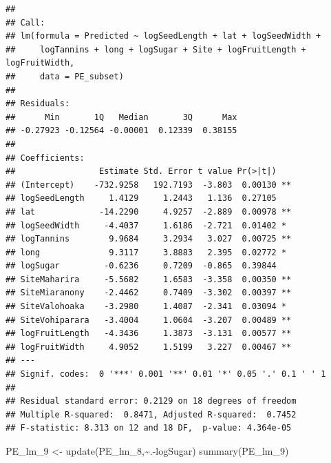 \documentclass[
  12pt,
]{article}
\newenvironment{Shaded}{\begin{snugshade}}{\end{snugshade}}
\newcommand{\FunctionTok}[1]{\textcolor[rgb]{0.00,0.00,0.00}{#1}}
\newcommand{\NormalTok}[1]{#1}
\newcommand{\OtherTok}[1]{\textcolor[rgb]{0.56,0.35,0.01}{#1}}
\newcommand{\SpecialCharTok}[1]{\textcolor[rgb]{0.00,0.00,0.00}{#1}}
\begin{document}
\begin{verbatim}
## 
## Call:
## lm(formula = Predicted ~ logSeedLength + lat + logSeedWidth + 
##     logTannins + long + logSugar + Site + logFruitLength + logFruitWidth, 
##     data = PE_subset)
## 
## Residuals:
##      Min       1Q   Median       3Q      Max 
## -0.27923 -0.12564 -0.00001  0.12339  0.38155 
## 
## Coefficients:
##                 Estimate Std. Error t value Pr(>|t|)   
## (Intercept)    -732.9258   192.7193  -3.803  0.00130 **
## logSeedLength     1.4129     1.2443   1.136  0.27105   
## lat             -14.2290     4.9257  -2.889  0.00978 **
## logSeedWidth     -4.4037     1.6186  -2.721  0.01402 * 
## logTannins        9.9684     3.2934   3.027  0.00725 **
## long              9.3117     3.8883   2.395  0.02772 * 
## logSugar         -0.6236     0.7209  -0.865  0.39844   
## SiteMaharira     -5.5682     1.6583  -3.358  0.00350 **
## SiteMiaranony    -2.4462     0.7409  -3.302  0.00397 **
## SiteValohoaka    -3.2980     1.4087  -2.341  0.03094 * 
## SiteVohiparara   -3.4004     1.0604  -3.207  0.00489 **
## logFruitLength   -4.3436     1.3873  -3.131  0.00577 **
## logFruitWidth     4.9052     1.5199   3.227  0.00467 **
## ---
## Signif. codes:  0 '***' 0.001 '**' 0.01 '*' 0.05 '.' 0.1 ' ' 1
## 
## Residual standard error: 0.2129 on 18 degrees of freedom
## Multiple R-squared:  0.8471, Adjusted R-squared:  0.7452 
## F-statistic: 8.313 on 12 and 18 DF,  p-value: 4.364e-05
\end{verbatim}

\begin{Shaded}
\begin{Highlighting}[]
\NormalTok{PE\_lm\_9 }\OtherTok{\textless{}{-}} \FunctionTok{update}\NormalTok{(PE\_lm\_8,}\SpecialCharTok{\textasciitilde{}}\NormalTok{.}\SpecialCharTok{{-}}\NormalTok{logSugar)}
\FunctionTok{summary}\NormalTok{(PE\_lm\_9)}
\end{Highlighting}
\end{Shaded}
\end{document}
